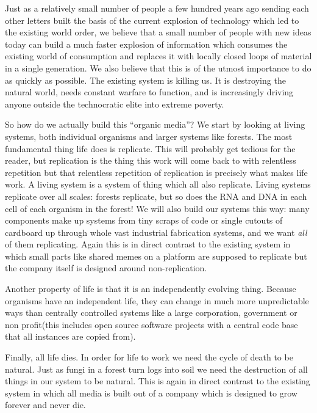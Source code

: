 Just as a relatively small number of people a few hundred years ago sending each other letters built the basis of the current explosion of technology which led to the existing world order, we believe that a small number of people with new ideas today can build a much faster explosion of information which consumes the existing world of consumption and replaces it with locally closed loops of material in a single generation.  We also believe that this is of the utmost importance to do as quickly as possible.  The existing system is killing us.  It is destroying the natural world, needs constant warfare to function, and is increasingly driving anyone outside the technocratic elite into extreme poverty.  

So how do we actually build this ``organic media''?  We start by looking at living systems, both individual organisms and larger systems like forests.  The most fundamental thing life does is replicate.   This will probably get tedious for the reader, but replication is the thing this work will come back to with relentless repetition but that relentless repetition of replication is precisely what makes life work.  A living system is a system of thing which all also replicate.  Living systems replicate over all scales: forests replicate, but so does the RNA and DNA in each cell of each organism in the forest!  We will also build our systems this way: many components make up systems from tiny scraps of code or single cutouts of cardboard up through whole vast industrial fabrication systems, and we want \emph{all} of them replicating.  Again this is in direct contrast to the existing system in which small parts like shared memes on a platform are supposed to replicate but the company itself is designed around non-replication.  

Another property of life is that it is an independently evolving thing.  Because organisms have an independent life, they can change in much more unpredictable ways than centrally controlled systems like a large corporation, government or non profit(this includes open source software projects with a central code base that all instances are copied from).  

Finally, all life dies.  In order for life to work we need the cycle of death to be natural.  Just as fungi in a forest turn logs into soil we need the destruction of all things in our system to be natural.  This is again in direct contrast to the existing system in which all media is built out of a company which is designed to grow forever and never die. 

